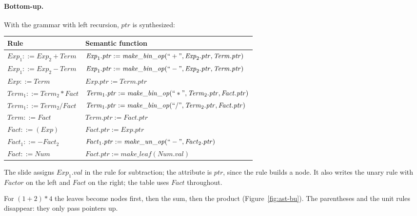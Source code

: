 \paragraph{Bottom-up.} With the grammar with left recursion, $\mathit{ptr}$ is
synthesized:
\begin{center}
\small
\begin{tabular}{l l}
  \toprule
  Rule & Semantic function \\
  \midrule
  $\mathit{Exp}_1 ::= \mathit{Exp}_2 + \mathit{Term}$ & $\mathit{Exp}_1.\mathit{ptr} := \mathit{make\_bin\_op}(``+", \mathit{Exp}_2.\mathit{ptr}, \mathit{Term}.\mathit{ptr})$ \\
  $\mathit{Exp}_1 ::= \mathit{Exp}_2 - \mathit{Term}$ & $\mathit{Exp}_1.\mathit{ptr} := \mathit{make\_bin\_op}(``-", \mathit{Exp}_2.\mathit{ptr}, \mathit{Term}.\mathit{ptr})$ \\
  $\mathit{Exp} ::= \mathit{Term}$ & $\mathit{Exp}.\mathit{ptr} := \mathit{Term}.\mathit{ptr}$ \\
  $\mathit{Term}_1 ::= \mathit{Term}_2 * \mathit{Fact}$ & $\mathit{Term}_1.\mathit{ptr} := \mathit{make\_bin\_op}(``*", \mathit{Term}_2.\mathit{ptr}, \mathit{Fact}.\mathit{ptr})$ \\
  $\mathit{Term}_1 ::= \mathit{Term}_2 / \mathit{Fact}$ & $\mathit{Term}_1.\mathit{ptr} := \mathit{make\_bin\_op}(``/", \mathit{Term}_2.\mathit{ptr}, \mathit{Fact}.\mathit{ptr})$ \\
  $\mathit{Term} ::= \mathit{Fact}$ & $\mathit{Term}.\mathit{ptr} := \mathit{Fact}.\mathit{ptr}$ \\
  $\mathit{Fact} ::= (\mathit{Exp})$ & $\mathit{Fact}.\mathit{ptr} := \mathit{Exp}.\mathit{ptr}$ \\
  $\mathit{Fact}_1 ::= - \mathit{Fact}_2$ & $\mathit{Fact}_1.\mathit{ptr} := \mathit{make\_un\_op}(``-", \mathit{Fact}_2.\mathit{ptr})$ \\
  $\mathit{Fact} ::= \mathit{Num}$ & $\mathit{Fact}.\mathit{ptr} := \mathit{make\_leaf}(\mathit{Num}.\mathit{val})$ \\
  \bottomrule
\end{tabular}
\end{center}
The slide assigns $\mathit{Exp}_1.\mathit{val}$ in the rule for subtraction; the
attribute is $\mathit{ptr}$, since the rule builds a node. It also writes the
unary rule with $\mathit{Factor}$ on the left and $\mathit{Fact}$ on the right; the
table uses $\mathit{Fact}$ throughout.

For $(1+2)*4$ the leaves become nodes first, then the sum, then the product
(Figure~\ref{fig:ast-bu}). The parentheses and the unit rules disappear: they
only pass pointers up.

